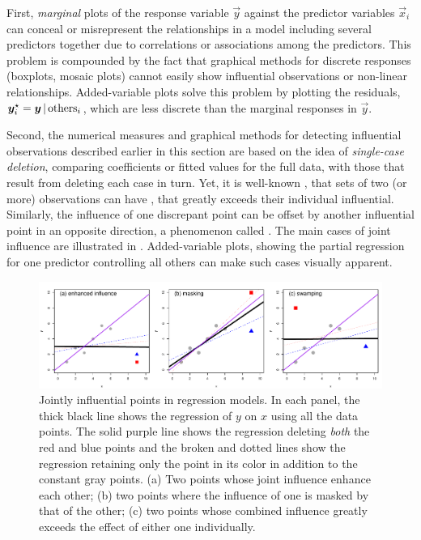 \documentclass[11pt]{book}\usepackage[]{graphicx}\usepackage[]{color}
\begin{document}
First, \emph{marginal} plots of the response variable $\vec{y}$ against the predictor variables
$\vec{x}_i$ can conceal or misrepresent the relationships in a model including several
predictors together due to correlations or associations among the predictors.   This problem is compounded by the fact that graphical methods for discrete responses (boxplots, mosaic plots)
cannot easily show influential observations or non-linear relationships.  Added-variable
plots solve this problem by plotting the residuals,
$\bm{y}_i^\star = \bm{y} \, | \, \mbox{others}_i$, which are less discrete than the
marginal responses in $\vec{y}$.

Second, the numerical measures and graphical methods for detecting influential observations described
earlier in this section are based on the idea of \emph{single-case deletion}, comparing
coefficients or fitted values for the full data, with those that result from deleting each
case in turn.
Yet, it is well-known \citep{Lawrance:1995}, that sets of two (or more) observations can
have , that greatly exceeds their individual influential.  
Similarly, the influence of one discrepant point can be offset by another influential point
in an opposite direction, a phenomenon called . The main 
cases of joint influence are illustrated in .
Added-variable plots, showing the partial regression for one predictor controlling all others
can make such cases visually apparent.

\begin{figure}[!htb]
  \includegraphics[width=\textwidth]{ch07/fig/joint}
  \caption{Jointly influential points in regression models. In each panel, the thick black line
  shows the regression of $y$ on $x$ using all the data points.  The solid purple line shows
  the regression deleting \emph{both} the red and blue points and the broken and dotted lines
  show the regression retaining only the point in its color in addition to the constant gray points. 
  (a) Two points whose joint influence enhance each other; (b) two points where the influence of one
  is masked by that of the other; (c) two points whose combined influence greatly exceeds the effect of either one individually.}
  \label{fig:joint}
\end{figure}
\end{document}
